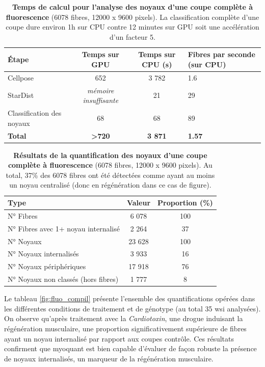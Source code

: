 \begin{table}[htbp]
\centering
\caption[Temps de calcul pour l'analyse des noyaux d'une coupe complète à fluorescence]{\textbf{Temps de calcul pour l'analyse des noyaux d'une coupe complète à fluorescence} (6078 fibres, 12000 x 9600 pixels). La classification complète d'une coupe dure environ 1h sur CPU contre 12 minutes sur GPU soit une accélération d'un facteur 5.}
\label{tab:myoquant_fluo_time}
\begin{tabularx}{\textwidth}{|l|c|c|X|}
\hline
\textbf{Étape} & \textbf{Temps sur GPU} & \textbf{Temps sur CPU (s)} & \textbf{Fibres par seconde (sur CPU)} \\
\hline
Cellpose & 652 & 3 782 & 1.6 \\
\hline
StarDist & \textit{mémoire insuffisante} & 21 & 29 \\
\hline
Classification des noyaux & 68 & 68 & 89 \\
\hline
\textbf{Total} & \textbf{>720} & \textbf{3 871} & \textbf{1.57} \\
\hline
\end{tabularx}
\end{table}

\begin{table}[htbp]
\centering
\caption[Résultats de la quantification des noyaux d'une coupe complète à fluorescence]{\textbf{Résultats de la quantification des noyaux d'une coupe complète à fluorescence} (6078 fibres, 12000 x 9600 pixels). Au total, 37\% des 6078 fibres ont été détectées comme ayant au moins un noyau centralisé (donc en régénération dans ce cas de figure).}
\label{tab:myoquant_fluo_results}
\begin{tabular}{|l|c|c|}
\hline
\textbf{Type} & \textbf{Valeur} & \textbf{Proportion (\%)} \\
\hline
N° Fibres & 6 078 & 100 \\
\hline
N° Fibres avec 1+ noyau internalisé & 2 264 & 37 \\
\hline
\hline
N° Noyaux & 23 628 & 100 \\
\hline
N° Noyaux internalisés & 3 933 & 16 \\
\hline
N° Noyaux périphériques & 17 918 & 76 \\
\hline
N° Noyaux non classés (hors fibres) & 1 777 & 8 \\
\hline
\end{tabular}
\end{table}

Le tableau \ref{fig:fluo_compil} présente l'ensemble des quantifications opérées dans les différentes conditions de traitement et de génotype (au total 35 \gls{wsi} analysées). On observe qu'après traitement avec la \textit{Cardiotoxin}, une drogue induisant la régénération musculaire, une proportion significativement supérieure de fibres ayant un noyau internalisé par rapport aux coupes contrôle. Ces résultats confirment que \gls{myoquant} est bien capable d'évaluer de façon robuste la présence de noyaux internalisés, un marqueur de la régénération musculaire.

